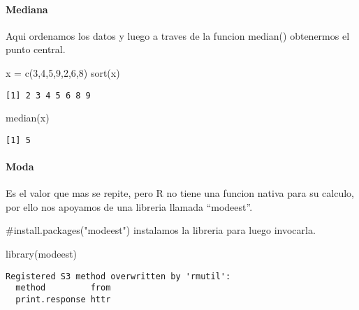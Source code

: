 \documentclass[
  letterpaper,
  DIV=11,
  numbers=noendperiod]{scrartcl}
\let\oldparagraph\paragraph
\renewcommand{\paragraph}[1]{\oldparagraph{#1}\mbox{}}
\newenvironment{Shaded}{\begin{snugshade}}{\end{snugshade}}
\newcommand{\CommentTok}[1]{\textcolor[rgb]{0.37,0.37,0.37}{#1}}
\newcommand{\DecValTok}[1]{\textcolor[rgb]{0.68,0.00,0.00}{#1}}
\newcommand{\FunctionTok}[1]{\textcolor[rgb]{0.28,0.35,0.67}{#1}}
\newcommand{\NormalTok}[1]{\textcolor[rgb]{0.00,0.23,0.31}{#1}}
\newcommand{\OtherTok}[1]{\textcolor[rgb]{0.00,0.23,0.31}{#1}}
\begin{document}
\paragraph{Mediana}\label{mediana}

Aqui ordenamos los datos y luego a traves de la funcion median()
obtenermos el punto central.

\begin{Shaded}
\begin{Highlighting}[]
\NormalTok{x }\OtherTok{=} \FunctionTok{c}\NormalTok{(}\DecValTok{3}\NormalTok{,}\DecValTok{4}\NormalTok{,}\DecValTok{5}\NormalTok{,}\DecValTok{9}\NormalTok{,}\DecValTok{2}\NormalTok{,}\DecValTok{6}\NormalTok{,}\DecValTok{8}\NormalTok{)}
\FunctionTok{sort}\NormalTok{(x)}
\end{Highlighting}
\end{Shaded}

\begin{verbatim}
[1] 2 3 4 5 6 8 9
\end{verbatim}

\begin{Shaded}
\begin{Highlighting}[]
\FunctionTok{median}\NormalTok{(x)}
\end{Highlighting}
\end{Shaded}

\begin{verbatim}
[1] 5
\end{verbatim}

\paragraph{Moda}\label{moda}

Es el valor que mas se repite, pero R no tiene una funcion nativa para
su calculo, por ello nos apoyamos de una libreria llamada ``modeest''.

\begin{Shaded}
\begin{Highlighting}[]
\CommentTok{\#install.packages("modeest") instalamos la libreria para luego invocarla.}

\FunctionTok{library}\NormalTok{(modeest)}
\end{Highlighting}
\end{Shaded}

\begin{verbatim}
Registered S3 method overwritten by 'rmutil':
  method         from
  print.response httr
\end{verbatim}
\end{document}
